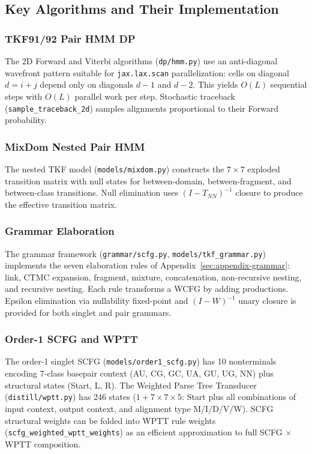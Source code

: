 \subsection{Key Algorithms and Their Implementation}
\label{sec:impl-algorithms}

\subsubsection{TKF91/92 Pair HMM DP}
The 2D Forward and Viterbi algorithms (\texttt{dp/hmm.py}) use an anti-diagonal wavefront
pattern suitable for \texttt{jax.lax.scan} parallelization:
cells on diagonal $d = i + j$ depend only on diagonals $d-1$ and $d-2$.
This yields $O(L)$ sequential steps with $O(L)$ parallel work per step.
Stochastic traceback (\texttt{sample\_traceback\_2d}) samples alignments
proportional to their Forward probability.

\subsubsection{MixDom Nested Pair HMM}
The nested TKF model (\texttt{models/mixdom.py}) constructs the
$7 \times 7$ exploded transition matrix with null states for between-domain,
between-fragment, and between-class transitions. Null elimination uses
$(I - T_{NN})^{-1}$ closure to produce the effective transition matrix.

\subsubsection{Grammar Elaboration}
The grammar framework (\texttt{grammar/scfg.py}, \texttt{models/tkf\_grammar.py}) implements
the seven elaboration rules of Appendix~\ref{sec:appendix-grammar}:
link, CTMC expansion, fragment, mixture, concatenation, non-recursive nesting,
and recursive nesting. Each rule transforms a WCFG by adding productions.
Epsilon elimination via nullability fixed-point and
$(I - W)^{-1}$ unary closure is provided for both singlet and pair grammars.

\subsubsection{Order-1 SCFG and WPTT}
The order-1 singlet SCFG (\texttt{models/order1\_scfg.py}) has 10 nonterminals
encoding 7-class basepair context (AU, CG, GC, UA, GU, UG, NN)
plus structural states (Start, L, R).
The Weighted Parse Tree Transducer (\texttt{distill/wptt.py}) has 246 states
($1 + 7 \times 7 \times 5$: Start plus all combinations of input context,
output context, and alignment type M/I/D/V/W).
SCFG structural weights can be folded into WPTT rule weights
(\texttt{scfg\_weighted\_wptt\_weights}) as an efficient approximation
to full SCFG $\times$ WPTT composition.

